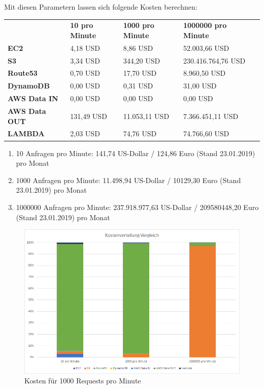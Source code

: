 \documentclass[a4paper, 12pt]{scrreprt}
\renewcommand\_{\textunderscore\allowbreak}
\begin{document}
Mit diesen Parametern lassen sich folgende Kosten berechnen:

\begin{table}[]
\begin{tabular}{|l|l|l|l|l}
\cline{1-4}
          & \textbf{10 pro Minute} & \textbf{1000 pro Minute} & \textbf{1000000 pro Minute} &  \\ \cline{1-4}
\textbf{EC2} & 4,18 USD & 8,86 USD & 52.003,66 USD &  \\ 
\cline{1-4}
\textbf{S3} & 3,34 USD & 344,20 USD &     230.416.764,76 USD &  \\ 
\cline{1-4}
\textbf{Route53} & 0,70 USD & 17,70 USD & 8.960,50 USD &  \\ 
\cline{1-4}
\textbf{DynamoDB} & 0,00 USD & 0,31 USD & 31,00 USD &  \\ 
\cline{1-4}
\textbf{AWS Data IN} & 0,00 USD & 0,00 USD & 0,00 USD      &  \\ 
\cline{1-4}
\textbf{AWS Data OUT} & 131,49 USD & 11.053,11 USD & 7.366.451,11 USD &  \\
\cline{1-4}
\textbf{LAMBDA} & 2,03 USD & 74,76 USD & 74.766,60 USD &  \\ \cline{1-4}
\end{tabular}
\end{table}

\begin{enumerate}
	\item 10 Anfragen pro Minute: 141,74 US-Dollar / 124,86 Euro (Stand 23.01.2019) pro Monat
	\item 1000 Anfragen pro Minute: 11.498,94 US-Dollar / 10129,30 Euro (Stand 23.01.2019) pro Monat
	\item 1000000 Anfragen pro Minute: 237.918.977,63 US-Dollar / 209580448,20 Euro (Stand 23.01.2019) pro Monat 
\end{enumerate}

\begin{figure}[h]
\centering
\includegraphics[scale=0.81]{costs-overview.png}
\caption{Kosten für 1000 Requests pro Minute}
\end{figure}
\end{document}

